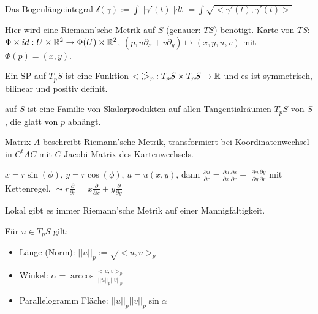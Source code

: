 \begin{defi}
    Das Bogenlängeintegral $\mathcal{l}(\gamma):=\int||\gamma'(t)||dt$
    $=\int\sqrt{<\gamma'(t),\gamma'(t)>}$
\end{defi}

\begin{defi}
    Hier wird eine Riemann'sche Metrik auf $S$ (genauer: $TS$) benötigt.
    Karte von $TS$: $\Phi\times id: U\times\mathbb R^2\to\Phi(U)\times\mathbb R^2$,
    $(p,u\partial_x + v\partial_y) \mapsto (x,y,u,v)$ mit $\Phi(p)=(x,y)$.
\end{defi}

\begin{defi}[Skalarprodukt]
    Ein SP auf $T_pS$ ist eine Funktion $<\dot,\dot>_p: T_pS\times T_pS\to\mathbb R$
    und es ist symmetrisch, bilinear und positiv definit.
\end{defi}

\begin{defi}
    auf $S$ ist eine Familie von Skalarprodukten auf allen Tangentialräumen $T_pS$ von $S$,
    die glatt von $p$ abhängt.
\end{defi}

\begin{bem}
    Matrix $A$ beschreibt Riemann'sche Metrik, 
    transformiert bei Koordinatenwechsel in $C^tAC$
    mit $C$ Jacobi-Matrix des Kartenwechsels.
\end{bem}

\begin{bsp}[Polarkoordinaten]
    $x=r\sin(\phi)$, $y=r\cos(\phi)$, $u=u(x,y)$, dann
    $\frac{\partial u}{\partial r} = \frac{\partial u}{\partial x}\frac{\partial x}{\partial r} + $
    $\frac{\partial u}{\partial y}\frac{\partial y}{\partial r}$
    mit Kettenregel. 
    $\leadsto r\frac{\partial}{\partial r} = x\frac{\partial}{\partial x} + y\frac{\partial}{\partial y}$
\end{bsp}

\begin{bem}
    Lokal gibt es immer Riemann'sche Metrik auf einer Mannigfaltigkeit.
\end{bem}

\begin{defi}
    Für $u\in T_pS$ gilt:
    \begin{itemize}
        \item Länge (Norm): $||u||_p:=\sqrt{<u,u>_p}$
        \item Winkel: $\alpha=\arccos\frac{<u,v>_p}{||u||_p||v||_p}$
        \item Parallelogramm Fläche: $||u||_p||v||_p\sin\alpha$
    \end{itemize}
\end{defi}

